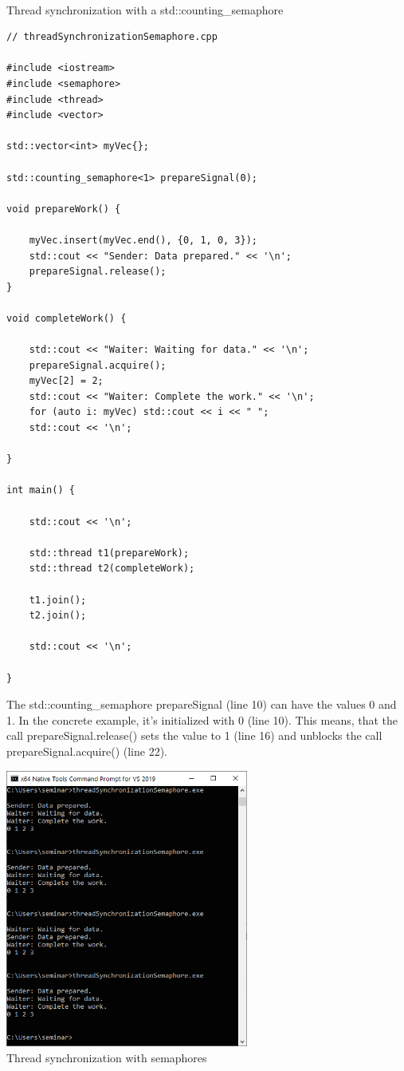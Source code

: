 \hspace*{\fill} \\ %
\noindent
Thread synchronization with a std::counting\_semaphore
\begin{lstlisting}[style=styleCXX]
// threadSynchronizationSemaphore.cpp

#include <iostream>
#include <semaphore>
#include <thread>
#include <vector>

std::vector<int> myVec{};

std::counting_semaphore<1> prepareSignal(0);

void prepareWork() {

	myVec.insert(myVec.end(), {0, 1, 0, 3});
	std::cout << "Sender: Data prepared." << '\n';
	prepareSignal.release();
}

void completeWork() {

	std::cout << "Waiter: Waiting for data." << '\n';
	prepareSignal.acquire();
	myVec[2] = 2;
	std::cout << "Waiter: Complete the work." << '\n';
	for (auto i: myVec) std::cout << i << " ";
	std::cout << '\n';

}

int main() {

	std::cout << '\n';
	
	std::thread t1(prepareWork);
	std::thread t2(completeWork);
	
	t1.join();
	t2.join();
	
	std::cout << '\n';

}
\end{lstlisting}

The std::counting\_semaphore prepareSignal (line 10) can have the values 0 and 1. In the concrete example, it’s initialized with 0 (line 10). This means, that the call prepareSignal.release() sets the value to 1 (line 16) and unblocks the call prepareSignal.acquire() (line 22).

\begin{center}
\includegraphics[width=0.6\textwidth]{content/3/chapter6/images/17.png}\\
Thread synchronization with semaphores
\end{center}


